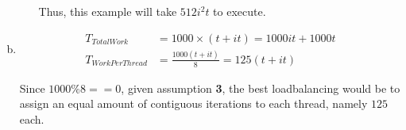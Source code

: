 \documentclass[fontsize=11pt, paper=a4, titlepage]{article}
\begin{document}
\begin{enumerate}[a)]
\begin{enumerate}[I)]
Thus, this example will take $512i^2t$ to execute.

    \end{enumerate}

    \item \begin{align*}
            T_{TotalWork} &= 1000\times(t+it) = 1000it+1000t \\
          T_{WorkPerThread} &= \frac{1000(t+it)}{8} = 125(t+it)
        \end{align*}

        Since $1000\%8 == 0$, given assumption \textbf{3}, the best
loadbalancing would be to assign an equal amount of contiguous
iterations to each thread, namely $125$ each.

\end{enumerate}
\end{document}
